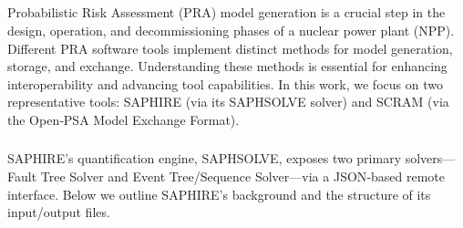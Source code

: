 
\subsection{\color{yellow}{Probabilistic Risk Assessment Model Structure}}
\label{sec:pra_model_structure}

Probabilistic Risk Assessment (PRA) model generation is a crucial step in the design, operation, and decommissioning phases of a nuclear power plant (NPP). Different PRA software tools implement distinct methods for model generation, storage, and exchange. Understanding these methods is essential for enhancing interoperability and advancing tool capabilities. In this work, we focus on two representative tools: SAPHIRE (via its SAPHSOLVE solver) and SCRAM (via the Open‑PSA Model Exchange Format).

\subsubsection{\color{yellow}{SAPHSOLVE Models}}
\label{sec:saphsolve_models}

SAPHIRE’s quantification engine, SAPHSOLVE, exposes two primary solvers—Fault Tree Solver and Event Tree/Sequence Solver—via a JSON‑based remote interface. Below we outline SAPHIRE’s background and the structure of its input/output files.

